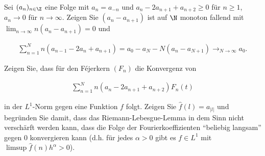 
\begin{exercise}

Sei $(a_n)_{n \in \Z}$ eine Folge mit $a_n = a_{-n}$ und $a_n - 2 a_{n+1} + a_{n+2} \geq 0$ für $n \geq 1$, $a_n \to 0$ für $n \to \infty$.
Zeigen Sie $(a_n - a_{n+1})$ ist auf $\N$ monoton fallend mit $\lim_{n \to \infty} n (a_n - a_{n+1}) = 0$ und

\begin{align} \label{eq:1}
    \sum_{n=1}^N
    n (a_{n-1} - 2 a_n + a_{n+1})
    =
    a_0 - a_N - N (a_n - a_{N+1})
    \to_{N \to \infty}
    a_0.
\end{align}

Zeigen Sie, dass für den Féjerkern $(F_n)$ die Konvergenz von

\begin{align} \label{eq:2}
    \sum_{n=1}^N
    n (a_n - 2 a_{n+1} + a_{n+2}) F_n(t)
\end{align}

in der $L^1$-Norm gegen eine Funktion $f$ folgt.
Zeigen Sie $\hat f(l) = a_{|l|}$ und begründen Sie damit, dass das Riemann-Lebesgue-Lemma in dem Sinn nicht verschärft werden kann, dass die Folge der Fourierkoeffizienten \enquote{beliebig langsam} gegen $0$ konvergieren kann (d.h. für jedes $\alpha > 0$ gibt es $f \in L^1$ mit $\limsup \hat f(n) h^\alpha > 0$).

\end{exercise}


